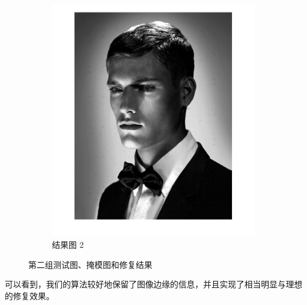 \documentclass[UTF8]{ctexart}
\begin{document}
\begin{figure}[H]
\begin{subfigure}[b]{0.3\textwidth}
        \includegraphics[width=\textwidth]{res2.jpg} %
        \caption{结果图 2}
        \label{fig:res2}
    \end{subfigure}
    \caption{第二组测试图、掩模图和修复结果}
    \label{fig:group2}
\end{figure}
可以看到，我们的算法较好地保留了图像边缘的信息，并且实现了相当明显与理想的修复效果。
\end{document}
